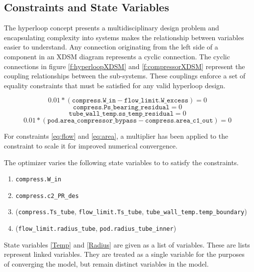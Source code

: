 \documentclass[heading.tex]{subfiles}
\begin{document}
\subsection{Constraints and State Variables}

The hyperloop concept presents a multidisciplinary design problem and encapsulating complexity into systems makes the relationship between variables easier to understand.  Any connection originating from the left side of a component in an XDSM diagram represents a cyclic connection. The cyclic connections in figure \ref{f:hyperloopXDSM}  and \ref{f:compressorXDSM} represent the coupling relationships between the sub-systems. These couplings enforce a set of equality constraints that must be satisfied for any valid hyperloop design. 

\begin{equation} \label{eq:flow}
	0.01*(\texttt{compress.W\_in} - \texttt{flow\_limit.W\_excess}) = 0
\end{equation}
\begin{equation}
	\texttt{compress.Ps\_bearing\_residual} = 0
\end{equation}
\begin{equation}
	\texttt{tube\_wall\_temp.ss\_temp\_residual} = 0
\end{equation}
\begin{equation} \label{eq:area}
	0.01*(\texttt{pod.area\_compressor\_bypass} - \texttt{compress.area\_c1\_out}) = 0
\end{equation}

For constraints \ref{eq:flow} and \ref{eq:area}, a multiplier has been applied to the constraint to scale it for improved numerical convergence.

The optimizer varies  the following state variables to to satisfy the constraints. 

\begin{enumerate}
\item \texttt{compress.W\_in}
\item \texttt{compress.c2\_PR\_des}
\item (\texttt{compress.Ts\_tube}, \texttt{flow\_limit.Ts\_tube}, \texttt{tube\_wall\_temp.temp\_boundary}) \label{Temp}
\item (\texttt{flow\_limit.radius\_tube}, \texttt{pod.radius\_tube\_inner}) \label{Radius}
\end{enumerate}

State variables \ref{Temp} and \ref{Radius} are given as a list of variables. These are lists represent linked variables. They are treated as a single variable for the purposes of converging the model, but remain distinct variables in the model.
\end{document}
